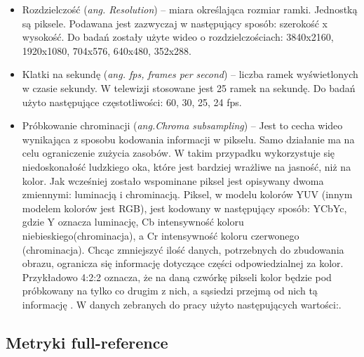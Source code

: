 \begin{itemize}[label=$\bullet$]
\item Rozdzielczość ({\em ang.  Resolution}) -- miara określająca rozmiar ramki. Jednostką są piksele. Podawana jest zazwyczaj w następujący sposób: szerokość x wysokość. Do badań zostały użyte wideo o rozdzielczościach: 3840x2160, 1920x1080, 704x576, 640x480, 352x288. 
\item Klatki na sekundę ({\em ang. fps, frames per second}) -- liczba ramek wyświetlonych w czasie sekundy. W telewizji stosowane jest 25 ramek na sekundę. Do badań użyto następujące częstotliwości: 60, 30, 25, 24 fps.
\item Próbkowanie chrominacji  ({\em ang.Chroma subsampling}) -- Jest to cecha  wideo wynikająca z sposobu kodowania  informacji w pikselu. Samo działanie ma na celu  ograniczenie zużycia zasobów.  W takim przypadku wykorzystuje się  niedoskonałość ludzkiego oka, które jest bardziej wrażliwe na jasność, niż na kolor. Jak wcześniej zostało wspominane piksel jest opisywany dwoma zmiennymi: luminacją i chrominacją. Piksel, w modelu kolorów YUV (innym modelem kolorów jest RGB),  jest  kodowany w następujący sposób: YCbYc, gdzie Y oznacza luminację, Cb intensywność koloru niebieskiego(chrominacja), a Cr intensywność koloru czerwonego (chrominacja). Chcąc zmniejszyć ilość danych, potrzebnych do zbudowania obrazu, ogranicza się informację dotyczące części odpowiedzialnej za kolor. Przykładowo 4:2:2 oznacza, że na daną czwórkę pikseli kolor będzie pod próbkowany na tylko co drugim z nich, a sąsiedzi przejmą od nich tą informację  \cite{chroma_sampling}. W danych zebranych do pracy użyto następujących wartości:.
\end{itemize}


\subsection{Metryki full-reference}


